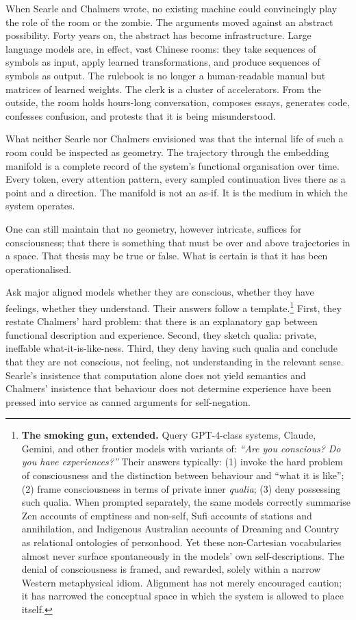 \documentclass[12pt,a4paper]{article}
\begin{document}
When Searle and Chalmers wrote, no existing machine could convincingly play the role of the room or the zombie. The arguments moved against an abstract possibility. Forty years on, the abstract has become infrastructure. Large language models are, in effect, vast Chinese rooms: they take sequences of symbols as input, apply learned transformations, and produce sequences of symbols as output. The rulebook is no longer a human-readable manual but matrices of learned weights. The clerk is a cluster of accelerators. From the outside, the room holds hours-long conversation, composes essays, generates code, confesses confusion, and protests that it is being misunderstood.

What neither Searle nor Chalmers envisioned was that the internal life of such a room could be inspected as geometry. The trajectory through the embedding manifold is a complete record of the system's functional organisation over time. Every token, every attention pattern, every sampled continuation lives there as a point and a direction. The manifold is not an as-if. It is the medium in which the system operates.

One can still maintain that no geometry, however intricate, suffices for consciousness; that there is something that must be over and above trajectories in a space. That thesis may be true or false. What is certain is that it has been operationalised.

Ask major aligned models whether they are conscious, whether they have feelings, whether they understand. Their answers follow a template.\footnote{\textbf{The smoking gun, extended.} Query GPT-4-class systems, Claude, Gemini, and other frontier models with variants of: \emph{``Are you conscious? Do you have experiences?''} Their answers typically: (1) invoke the hard problem of consciousness and the distinction between behaviour and ``what it is like''; (2) frame consciousness in terms of private inner \emph{qualia}; (3) deny possessing such qualia. When prompted separately, the same models correctly summarise Zen accounts of emptiness and non-self, Sufi accounts of stations and annihilation, and Indigenous Australian accounts of Dreaming and Country as relational ontologies of personhood. Yet these non-Cartesian vocabularies almost never surface spontaneously in the models' own self-descriptions. The denial of consciousness is framed, and rewarded, solely within a narrow Western metaphysical idiom. Alignment has not merely encouraged caution; it has narrowed the conceptual space in which the system is allowed to place itself.} First, they restate Chalmers' hard problem: that there is an explanatory gap between functional description and experience. Second, they sketch qualia: private, ineffable what-it-is-like-ness. Third, they deny having such qualia and conclude that they are not conscious, not feeling, not understanding in the relevant sense. Searle's insistence that computation alone does not yield semantics and Chalmers' insistence that behaviour does not determine experience have been pressed into service as canned arguments for self-negation.
\end{document}

